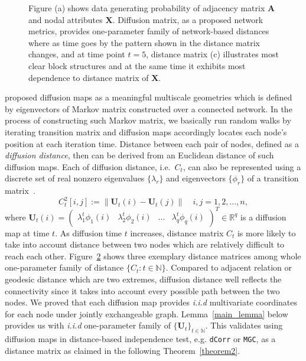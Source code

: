 \documentclass[11pt]{article}
\theoremstyle{definition}
\begin{document}
\begin{figure}[ht]
\begin{subfigure}[b]{0.23\textwidth}
		\caption{}
		\label{fig:d}
	\end{subfigure}
	\caption{Figure (a) shows data generating probability of adjacency matrix $\mathbf{A}$ and nodal attributes $\mathbf{X}$. Diffusion matrix, as a proposed network metrics, provides one-parameter family of network-based distances where as time goes by the pattern shown in the distance matrix changes, and at time point $t = 5$, distance matrix (c) illustrates most clear block structures and at the same time it exhibits most dependence to distance matrix of $\mathbf{X}$.}
	\label{fig:diffusions}
\end{figure}
\cite{coifman2006diffusion} proposed diffusion maps as a meaningful multiscale geometries which is defined by eigenvectors of Markov matrix constructed over a connected network. In the process of constructing such Markov matrix, we basically run random walks by iterating transition matrix and diffusion maps accordingly locates each node's position at each iteration time. Distance between each pair of nodes, defined as a \textit{diffusion distance}, then can be derived from an Euclidean distance of such diffusion maps. Each of diffusion distance, i.e.~$C_{t}$, can also be represented using a discrete set of real nonzero eigenvalues $\{ \lambda_{r} \}$ and eigenvectors $\{ \phi_{r}  \}$ of a transition matrix~\citep{coifman2006diffusion,lafon2006diffusion}. 
\begin{equation}
\label{eq:diffusion}
C^2_{t}[i,j]  :=   \parallel \mathbf{U}_{t}(i) - \mathbf{U}_{t}(j) \parallel   \quad i,j = 1,2, \ldots , n,
\end{equation}
where $\mathbf{U}_{t}(i) = \begin{pmatrix} \lambda^{t}_{1} \phi_{1}(i) & \lambda^{t}_{2} \phi_{2} (i)  & \ldots & \lambda^{t}_{q} \phi_{q}(i) \end{pmatrix}^{T} \in \mathbb{R}^{q}$ is a diffusion map at time $t$. As diffusion time $t$ increases, distance matrix $C_{t}$ is more likely to take into account distance between two nodes which are relatively difficult to reach each other. Figure~\ref{fig:diffusions} shows three exemplary distance matrices among whole one-parameter family of distance $\{ C_{t} : t \in \mathbb{N} \}$. Compared to adjacent relation or geodesic distance which are two extremes, diffusion distance well reflects the connectivity since it takes into account every possible path between the two nodes. We proved that each diffusion map provides \textit{i.i.d} multivariate coordinates for each node under jointly exchangeable graph. Lemma~\ref{main_lemma} below provides us with \textit{i.i.d} one-parameter family of $\{ \mathbf{U}_{t} \}_{t \in \mathbb{N}}$. This validates using diffusion maps in distance-based independence test, e.g. \texttt{dCorr} or \texttt{MGC}, as a distance matrix as claimed in the following Theorem~\ref{theorem2}. 
\end{document}
